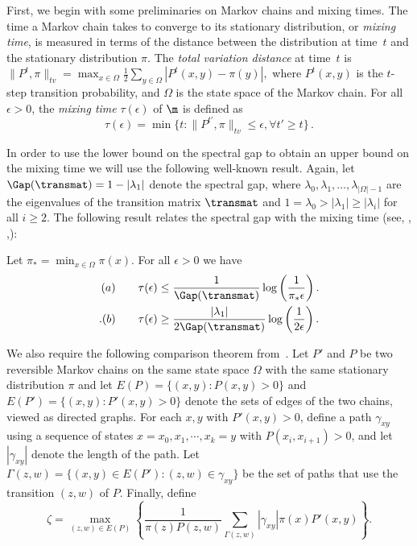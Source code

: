 First, we begin with some preliminaries on Markov chains and mixing 
times.  The time a Markov chain takes to converge to its stationary 
distribution, or \emph{mixing time}, is measured in terms of the 
distance between the distribution at time~$t$ and the stationary 
distribution $\pi$. %
 The \emph{total variation distance} at time~$t$ is 
$\|P^t,\pi\| _{tv} = \max_{x\in\Omega}\frac{1}{2}\sum_{y\in\Omega} 
|P^t(x,y)-\pi(y)|,$  %
where $P^t(x,y)$ is the $t$-step transition 
probability, 
and $\Omega$ is the state space of the Markov chain.  %
For all $\epsilon>0$, the \emph{mixing time} 
$\tau(\epsilon)$ of $\m$ is defined as
$$\tau(\epsilon)=\min \{t: \|P^{t'},\pi \|_{tv}\leq \epsilon, \forall t' \geq t\}\,.$$ 

In order to use the lower bound on the spectral gap to obtain an upper bound on the mixing time we will use the following well-known result. 
Again, let $\Gap(\transmat)=1-|\lambda_1|$ denote the spectral gap, where $\lambda_0, \lambda_1, \ldots, \lambda_{|\Omega|-1}$ are the eigenvalues of the transition matrix $\transmat$ and $1=\lambda_0>|\lambda_1|\geq |\lambda_i|$ for all $i\geq 2$. The following result  relates the spectral gap with the mixing time (see, \eg, \cite{sinclair},\cite{RM03}):

%
\begin{theorem}[\cite{RM03}]\label{gap}
Let $\pi_*=\min_{x\in\Omega} \pi (x)$. For all $\epsilon>0$ we have
\begin{align*}
(a)\qquad \tau(\epsilon)&\leq \frac{1}{\Gap(\transmat)} \log\left(\frac{1}{\pi_*\epsilon}\right).\\. %
(b)\qquad \tau(\epsilon)&\geq \frac{|\lambda_1|}{2\Gap(\transmat)} \log\left(\frac{1}{2\epsilon}\right).
%
%
\end{align*}
\end{theorem}
%
%

We also require the following comparison theorem
%
%
{}from~\cite{dsc}.   %
Let $P'$ and $P$ be two
reversible Markov chains on the same state space $\Omega$ with the same 
stationary distribution $\pi$ and let $E(P) = \{(x,y): P(x,y) >
0\}$ and $E(P') = \{(x,y): P'(x,y) > 0\}$ denote the sets of edges of
the two chains, viewed as directed graphs.  For each $x,y$ with
$P'(x,y)>0$, define a path $\gamma_{xy}$ using a sequence of states
$x=x_0,x_1,\cdots,x_k = y$ with $P(x_i,x_{i+1})>0$, and let
$|\gamma_{xy}|$ denote the length of the path.  Let $\Gamma(z,w) =
\{(x,y) \in E(P'): (z,w) \in \gamma_{xy}\}$ be the set of paths that
use the transition $(z,w)$ of $P$.  Finally, define  
\abovedisplayskip=3pt
\belowdisplayskip=3pt
\begin{equation}\label{eqn:zeta}
\zeta = \max_{(z,w) \in E(P)} \left \{\frac{1}{\pi(z)P(z,w)}
\sum_{\Gamma(z,w)}|\gamma_{xy}|\pi(x)P'(x,y) \right \}.
\end{equation}

